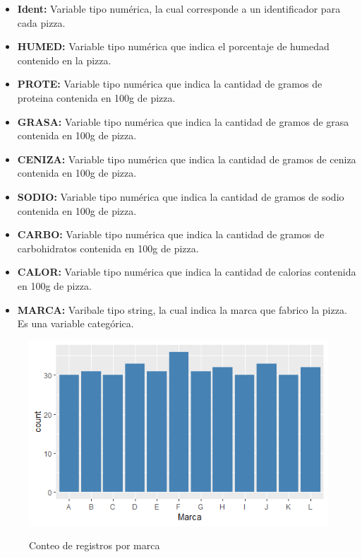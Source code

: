 \documentclass[pdf]{beamer}
\begin{document}
\begin{frame}
\begin{itemize}
\item \textbf{Ident:} Variable tipo numérica, la cual corresponde a un identificador para cada pizza.
\item \textbf{HUMED:} Variable tipo numérica que indica el porcentaje de humedad contenido en la pizza.
\item \textbf{PROTE:} Variable tipo numérica que indica la cantidad de gramos de proteina contenida en 100g de pizza.
\item \textbf{GRASA:} Variable tipo numérica que indica la cantidad de gramos de grasa contenida en 100g de pizza.
\item \textbf{CENIZA:} Variable tipo numérica que indica la cantidad de gramos de ceniza contenida en 100g de pizza.
\item \textbf{SODIO:} Variable tipo numérica que indica la cantidad de gramos de sodio contenida en 100g de pizza.
\item \textbf{CARBO:} Variable tipo numérica que indica la cantidad de gramos de carbohidratos contenida en 100g de pizza.
\item \textbf{CALOR:} Variable tipo numérica que indica la cantidad de calorias contenida en 100g de pizza.
\item \textbf{MARCA:} Varibale tipo string, la cual indica la marca que fabrico la pizza. Es una variable categórica.
\end{itemize}
\end{frame}

\begin{frame}
\begin{figure}[h]
\centering
\includegraphics[scale=1]{images/marca.png} 
\label{i1}
\caption{Conteo de registros por marca}
\end{figure}
\end{frame}
\end{document}
